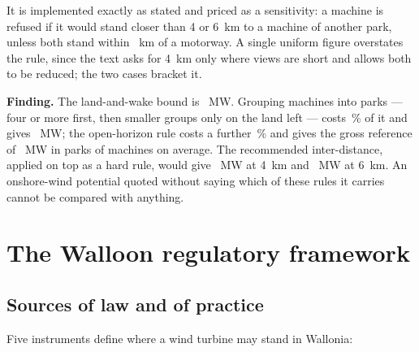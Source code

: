 \documentclass[11pt,a4paper]{article}
\newcommand{\finding}[1]{\par\medskip\noindent\colorbox{wal!10}{%
  \begin{minipage}{\dimexpr\linewidth-2\fboxsep}\textbf{Finding.} #1\end{minipage}}\par\medskip}
\begin{document}
It is implemented exactly as stated and priced as a sensitivity: a machine is
refused if it would stand closer than 4 or 6~km to a machine of another park,
unless both stand within \MotorwayExempt{}~km of a motorway. A single uniform
figure overstates the rule, since the text asks for 4~km only where views are
short and allows both to be reduced; the two cases bracket it.

\finding{The land-and-wake bound is \FreePnom{}~MW. Grouping machines into parks
--- four or more first, then smaller groups only on the land left --- costs
\ParksCostPct{}\,\% of it and gives
\NoHorizonPnom{}~MW; the open-horizon rule costs a further
\HorizonCostPct{}\,\% and gives the gross reference of \PlacePnom{}~MW in
\PlaceParks{} parks of \PlacePerPark{} machines on average. The recommended
inter-distance, applied on top as a hard rule, would give \IdFourMW{}~MW at
4~km and \IdSixMW{}~MW at 6~km. An onshore-wind potential quoted without saying
which of these rules it carries cannot be compared with anything.}

\section{The Walloon regulatory framework}\label{sec:rules}

\subsection{Sources of law and of practice}

Five instruments define where a wind turbine may stand in Wallonia:
\end{document}

